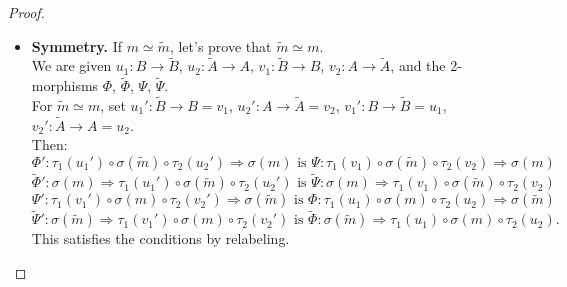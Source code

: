 \documentclass[a4paper,10pt]{article}
\theoremstyle{plain}
\theoremstyle{definition}
\theoremstyle{remark}
\begin{document}
\begin{proof}
\begin{itemize}
    \item \textbf{Symmetry.} If \(m \simeq \tilde{m}\), let's prove that \(\tilde{m} \simeq m\). \\
          We are given \(u_1: B \to \tilde{B}\), \(u_2: \tilde{A} \to A\), \(v_1: \tilde{B} \to B\), \(v_2: A \to \tilde{A}\), and the 2-morphisms \(\Phi\), \(\tilde{\Phi}\), \(\Psi\), \(\tilde{\Psi}\). \\
          For \(\tilde{m} \simeq m\), set \(u_1': \tilde{B} \to B = v_1\), \(u_2': A \to \tilde{A} = v_2\), \(v_1': B \to \tilde{B} = u_1\), \(v_2': \tilde{A} \to A = u_2\). \\
          Then:
          \[ \Phi': \tau_1(u_1') \circ \sigma(\tilde{m}) \circ \tau_2(u_2') \Rightarrow \sigma(m) \text{ is }\Psi: \tau_1(v_1) \circ \sigma(\tilde{m}) \circ \tau_2(v_2) \Rightarrow \sigma(m)  \]
          \[ \tilde{\Phi}': \sigma(m) \Rightarrow \tau_1(u_1') \circ \sigma(\tilde{m}) \circ \tau_2(u_2') \text{ is } \tilde{\Psi}: \sigma(m) \Rightarrow \tau_1(v_1) \circ \sigma(\tilde{m}) \circ \tau_2(v_2) \]
          \[ \Psi': \tau_1(v_1') \circ \sigma(m) \circ \tau_2(v_2') \Rightarrow \sigma(\tilde{m}) \text{ is } \Phi: \tau_1(u_1) \circ \sigma(m) \circ \tau_2(u_2) \Rightarrow \sigma(\tilde{m}) \]
          \[ \tilde{\Psi}': \sigma(\tilde{m}) \Rightarrow \tau_1(v_1') \circ \sigma(m) \circ \tau_2(v_2') \text{ is } \tilde{\Phi}: \sigma(\tilde{m}) \Rightarrow \tau_1(u_1) \circ \sigma(m) \circ \tau_2(u_2). \]
          This satisfies the conditions by relabeling.


\end{itemize}
\end{proof}
\end{document}
